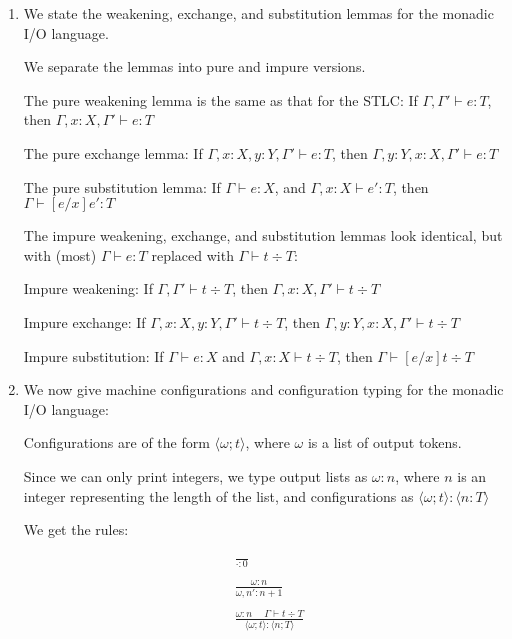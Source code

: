 


    \begin{enumerate}
      \item
        We state the weakening, exchange, and substitution lemmas for the monadic I/O language.

        We separate the lemmas into pure and impure versions.

        The pure weakening lemma is the same as that for the STLC: If $\Gamma, \Gamma' \vdash e : T$, then $\Gamma, x : X, \Gamma' \vdash e : T$

        The pure exchange lemma: If $\Gamma, x : X , y : Y, \Gamma' \vdash e : T$, then $\Gamma, y : Y, x : X, \Gamma'\vdash e : T$

        The pure substitution lemma: If $\Gamma \vdash e : X$, and $\Gamma, x : X \vdash e' : T$, then $\Gamma \vdash [e / x]e' : T$

        The impure weakening, exchange, and substitution lemmas look identical, but with (most) $\Gamma \vdash e : T$ replaced with $\Gamma \vdash t \div T$:

        Impure weakening: If $\Gamma, \Gamma' \vdash t \div T$, then $\Gamma, x : X, \Gamma' \vdash t \div T$

        Impure exchange: If $\Gamma, x : X, y : Y, \Gamma' \vdash t \div T$, then $\Gamma, y : Y, x : X, \Gamma' \vdash t \div T$

        Impure substitution: If $\Gamma \vdash e : X$ and $\Gamma, x : X \vdash t \div T$, then $\Gamma \vdash [e / x]t \div T$

      \item
        We now give machine configurations and configuration typing for the monadic I/O language:

        Configurations are of the form $\langle \omega; t \rangle$, where $\omega$ is a list of output tokens.

          Since we can only print integers, we type output lists as $\omega : n$, where $n$ is an integer representing the length of the list, and configurations as $\langle \omega;t \rangle : \langle n : T \rangle$

        We get the rules:

        \begin{align*}
          &\frac{}{\cdot : 0}\\
          \\
          &\frac{\omega : n}{\omega,n' : n+1}\\
          \\
          &\frac{\omega : n \hspace{15pt} \Gamma \vdash t \div T}{\langle \omega; t\rangle : \langle n;T\rangle}\\
        \end{align*}


\end{enumerate}
